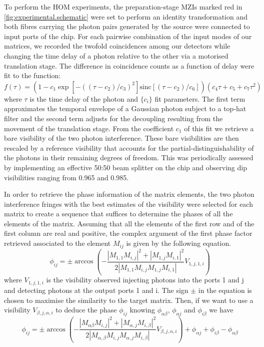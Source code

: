 To perform the HOM experiments, the preparation-stage MZIs marked red in \cref{fig:experimental.schematic} were set to perform an identity transformation and both fibres carrying the photon pairs generated by the source were connected to input ports of the chip.
For each pairwise combination of the input modes of our matrices, we recorded the twofold coincidences among our detectors while changing the time delay of a photon relative to the other via a motorised translation stage.
The difference in coincidence counts as a function of delay were fit to the function:
\[
  f(\tau)=\left(1-c_1\exp[-((\tau - c_2)/c_3)^2]\mathrm{sinc}[(\tau - c_2)/c_6]\right)(c_4\tau + c_5 + c_7 \tau^2)
\]
where $\tau$ is the time delay of the photon and $\{c_i\}$ fit parameters.
The first term approximates the temporal envelope of a Gaussian photon subject to a top-hat filter and the second term adjusts for the decoupling resulting from the movement of the translation stage.
From the coefficient $c_1$ of this fit we retrieve a bare visibility of the two photon interference.
These bare visibilities are then rescaled by a reference visibility that accounts for the partial-distinguishability of the photons in their remaining degrees of freedom.
This was periodically assessed by implementing an effective 50:50 beam splitter on the chip and observing dip visibilities ranging from 0.965 and 0.985.

In order to retrieve the phase information of the matrix elements, the two photon interference fringes with the best estimates of the visibility were selected for each matrix to create a sequence that suffices to determine the phases of all the elements of the matrix.
Assuming that all the elements of the first row and of the first column are real and positive, the complex argument of the first phase factor retrieved associated to the element $M_{ij}$ is given by the following equation.
\[
\phi_{ij}=\pm  \arccos\left( - \frac{|M_{1,1}M_{i,j}|^2+|M_{1,j}M_{i,1}|^2}{2 |M_{1,1}M_{i,j}M_{1,j}M_{i,1}|} V_{1,j,1,i} \right)
\]
where $V_{1,j,1,i}$ is the visibility observed injecting photons into the ports 1 and j and detecting photons at the output ports 1 and i.
The sign $\pm$ in the equation is chosen to maximise the similarity to the target matrix.
Then, if we want to use a visibility $V_{\beta,j,\alpha,i}$ to deduce the phase $\phi_{ij}$ knowing $\phi_{\alpha \beta}$, $\phi_{\alpha j}$ and $\phi_{i \beta}$ we have
\[
\phi_{ij}=\pm   \arccos\left( - \frac{|M_{\alpha \beta}M_{i,j}|^2+|M_{\alpha,j}M_{i,\beta}|^2}{2 |M_{\alpha,\beta}M_{i,j}M_{\alpha,j}M_{i,\beta}|} V_{\beta,j,\alpha,i} \right) +\phi_{\alpha j} +\phi_{i \beta} -\phi_{\alpha \beta}
\]



